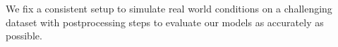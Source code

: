 

We fix a consistent setup to simulate real world conditions on a challenging dataset with postprocessing steps to evaluate our models as accurately as possible.

